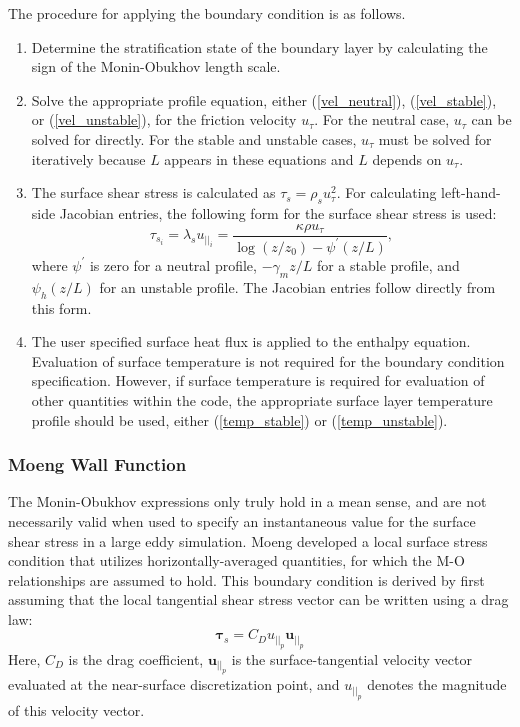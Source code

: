 The procedure for applying the boundary condition is as follows.
\begin{enumerate}
\item Determine the stratification state of the boundary layer by
  calculating the sign of the Monin-Obukhov length scale.
\item Solve the appropriate profile equation, either
  (\ref{vel_neutral}), (\ref{vel_stable}), or (\ref{vel_unstable}),
  for the friction velocity $u_\tau$.  For the neutral case, $u_\tau$ can be
  solved for directly.  For the stable and unstable cases, $u_\tau$ must
  be solved for iteratively because $L$ appears in these equations and
  $L$ depends on $u_\tau$.
\item The surface shear stress is calculated as $\tau_s = \rho_s u_\tau^2$.
  For calculating left-hand-side Jacobian entries, the following form
  for the surface shear stress is used:
  \begin{equation} \label{tau_s_useful}
   \tau_{s_i} = \lambda_s u_{||_i} = \frac{\kappa\rho
     u_\tau}{\log(z/z_0) - \psi^\prime (z/L)},
  \end{equation}
  where $\psi^\prime$ is zero for a neutral profile, $-\gamma_m z/L$
  for a stable profile, and $\psi_h(z/L)$ for an unstable profile.
  The Jacobian entries follow directly from this form.
\item The user specified surface heat flux is applied to the enthalpy
  equation.  Evaluation of surface temperature is not required for
  the boundary condition specification.  However, if surface
  temperature is required for evaluation of other quantities within
  the code, the appropriate surface layer temperature profile should
  be used, either (\ref{temp_stable}) or (\ref{temp_unstable}).
\end{enumerate}

\subsubsection{Moeng Wall Function}
The Monin-Obukhov expressions only truly hold in a mean sense, and are not
necessarily valid when used to specify an instantaneous value for the
surface shear stress in a large eddy simulation. Moeng \cite{Moeng:84}
developed a local surface stress condition that utilizes
horizontally-averaged quantities, for which the M-O relationships are
assumed to hold.  This boundary condition is derived by first assuming
that the local tangential shear stress vector can be written using a
drag law:
\begin{equation} \label{draglaw}
  \mathbf{\tau}_s  = C_D u_{{||}_p} \mathbf{u}_{{||}_p}
\end{equation}
Here, $C_D$ is the drag coefficient, $\mathbf{u}_{{||}_p}$ is the
surface-tangential velocity vector evaluated at the near-surface
discretization point, and $u_{{||}_p}$ denotes the magnitude of this
velocity vector.

